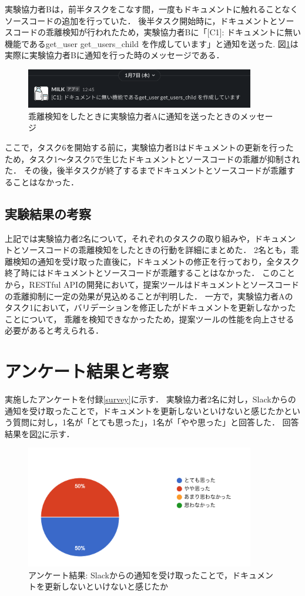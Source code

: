 実験協力者Bは，前半タスクをこなす間，一度もドキュメントに触れることなくソースコードの追加を行っていた．
後半タスク開始時に，ドキュメントとソースコードの乖離検知が行われたため，実験協力者Bに「[C1]: ドキュメントに無い機能であるget\_user get\_users\_child を作成しています」と通知を送った.
図\ref{notification2}は実際に実験協力者Bに通知を行った時のメッセージである．

\begin{figure}[H]
    \centering
    \includegraphics[width=10cm]{images/notification2.png}
    \caption{乖離検知をしたときに実験協力者Aに通知を送ったときのメッセージ}
    \label{notification2}
\end{figure}

ここで，タスク6を開始する前に，実験協力者Bはドキュメントの更新を行ったため，タスク1〜タスク5で生じたドキュメントとソースコードの乖離が抑制された．
その後，後半タスクが終了するまでドキュメントとソースコードが乖離することはなかった．

\subsection{実験結果の考察}
上記では実験協力者2名について，それぞれのタスクの取り組みや，ドキュメントとソースコードの乖離検知をしたときの行動を詳細にまとめた．
2名とも，乖離検知の通知を受け取った直後に，ドキュメントの修正を行っており，全タスク終了時にはドキュメントとソースコードが乖離することはなかった．
このことから，RESTful APIの開発において，提案ツールはドキュメントとソースコードの乖離抑制に一定の効果が見込めることが判明した．
一方で，実験協力者Aのタスク1において，バリデーションを修正したがドキュメントを更新しなかったことについて，
乖離を検知できなかったため，提案ツールの性能を向上させる必要があると考えられる．

\section{アンケート結果と考察}
実施したアンケートを付録\ref{survey}に示す．
実験協力者2名に対し，Slackからの通知を受け取ったことで，ドキュメントを更新しないといけないと感じたかという質問に対し，1名が「とても思った」，1名が「やや思った」と回答した．
回答結果を図\ref{q1}に示す．
\begin{figure}[H]
    \centering
    \includegraphics[width=10cm]{images/q1.png}
    \caption{アンケート結果: Slackからの通知を受け取ったことで，ドキュメントを更新しないといけないと感じたか}
    \label{q1}
\end{figure}

